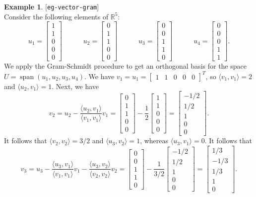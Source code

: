 \documentclass{amsart}
\newcommand{\lbl}[1]{\label{#1}\textup{[\texttt{#1}]}\ \\}
\newcommand{\lbl}{\label}
\newcommand{\R}         {{\mathbb{R}}}
\newcommand{\spn}       {\operatorname{span}}
\newcommand{\bsm}       {\left[\begin{smallmatrix}}
\newcommand{\esm}       {\end{smallmatrix}\right]}
\newcommand{\ip}[1]     {\langle #1\rangle}
\renewcommand{\:}       {\colon}
\theoremstyle{definition}
\newtheorem{example}[theorem]{Example}
\begin{document}
\begin{example}\lbl{eg-vector-gram}
 Consider the following elements of $\R^5$:
 \[
  u_1 = \bsm 1\\ 1\\ 0\\ 0\\ 0 \esm \hspace{3em}
  u_2 = \bsm 0\\ 1\\ 1\\ 0\\ 0 \esm \hspace{3em}
  u_3 = \bsm 0\\ 0\\ 1\\ 1\\ 0 \esm \hspace{3em}
  u_4 = \bsm 0\\ 0\\ 0\\ 1\\ 1 \esm.
 \]
 We apply the Gram-Schmidt procedure to get an orthogonal
 basis for the space $U=\spn(u_1,u_2,u_3,u_4)$.  We have
 $v_1=u_1=\bsm 1&1&0&0&0\esm^T$, so $\ip{v_1,v_1}=2$ and
 $\ip{u_2,v_1}=1$.  Next, we have  
 \[ v_2 = u_2 - \frac{\ip{u_2,v_1}}{\ip{v_1,v_1}} v_1
        = \bsm 0\\ 1\\ 1\\ 0\\ 0\esm - 
          \frac{1}{2}\bsm 1\\1\\0\\0\\0 \esm 
        = \bsm -1/2 \\ 1/2 \\ 1 \\ 0 \\ 0 \esm.
 \]
 It follows that $\ip{v_2,v_2}=3/2$ and $\ip{u_3,v_2}=1$,
 whereas $\ip{u_3,v_1}=0$.  It follows that 
 \[ v_3 = u_3 - \frac{\ip{u_3,v_1}}{\ip{v_1,v_1}} v_1
              - \frac{\ip{u_3,v_2}}{\ip{v_2,v_2}} v_2
        = \bsm 0\\ 0\\ 1\\ 1\\ 0\esm - 
          \frac{1}{3/2}\bsm -1/2\\1/2\\1\\0\\0 \esm 
        = \bsm 1/3 \\ -1/3 \\ 1/3 \\ 1 \\ 0 \esm.
\]
\end{example}
\end{document}
